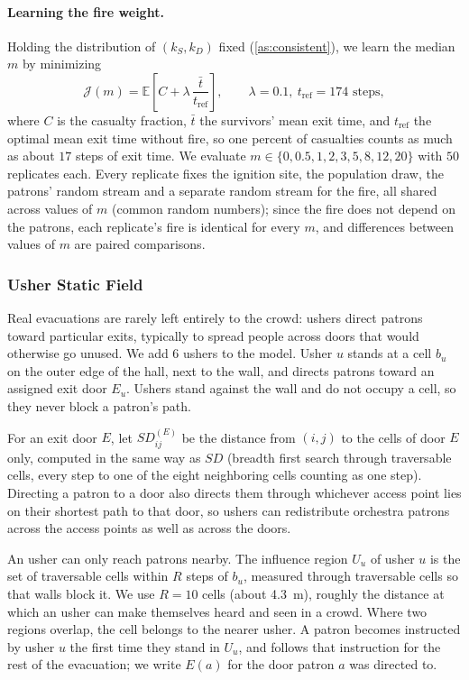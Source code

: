 \documentclass[14pt]{article}
\theoremstyle{definition}
\begin{document}
\paragraph{Learning the fire weight.}\label{sec:learn_kF} Holding the distribution of
$(k_S, k_D)$ fixed (\cref{as:consistent}), we learn the median $m$ by minimizing
\begin{equation}\label{eq:fire_objective}
  \mathcal{J}(m) = \mathbb{E}\left[C + \lambda\, \frac{\bar t}{t_{\text{ref}}}\right],
  \qquad \lambda = 0.1,\ t_{\text{ref}} = 174 \text{ steps},
\end{equation}
where $C$ is the casualty fraction, $\bar t$ the survivors' mean exit time, and
$t_{\text{ref}}$ the optimal mean exit time without fire, so one percent of casualties
counts as much as about $17$ steps of exit time. We evaluate
$m \in \{0, 0.5, 1, 2, 3, 5, 8, 12, 20\}$ with $50$ replicates each. Every replicate
fixes the ignition site, the population draw, the patrons' random stream and a separate
random stream for the fire, all shared across values of $m$ (common random numbers);
since the fire does not depend on the patrons, each replicate's fire is identical for
every $m$, and differences between values of $m$ are paired comparisons.

\subsubsection{Usher Static Field}\label{sec:ushers}
Real evacuations are rarely left entirely to the crowd: ushers direct patrons toward
particular exits, typically to spread people across doors that would otherwise go
unused. We add $6$ ushers to the model. Usher $u$ stands at a cell $b_u$ on the outer
edge of the hall, next to the wall, and directs patrons toward an assigned exit door
$E_u$. Ushers stand against the wall and do not occupy a cell, so they never block a
patron's path.

For an exit door $E$, let $SD^{(E)}_{ij}$ be the distance from $(i,j)$ to the cells of
door $E$ only, computed in the same way as $SD$ (breadth first search through
traversable cells, every step to one of the eight neighboring cells counting as one
step). Directing a patron to a door also directs them through whichever access point
lies on their shortest path to that door, so ushers can redistribute orchestra patrons
across the access points as well as across the doors.

An usher can only reach patrons nearby. The influence region $U_u$ of usher $u$ is the
set of traversable cells within $R$ steps of $b_u$, measured through traversable cells
so that walls block it. We use $R = 10$ cells (about \SI{4.3}{m}), roughly the distance
at which an usher can make themselves heard and seen in a crowd. Where two regions
overlap, the cell belongs to the nearer usher. A patron becomes instructed by usher $u$
the first time they stand in $U_u$, and follows that instruction for the rest of the
evacuation; we write $E(a)$ for the door patron $a$ was directed to.
\end{document}
